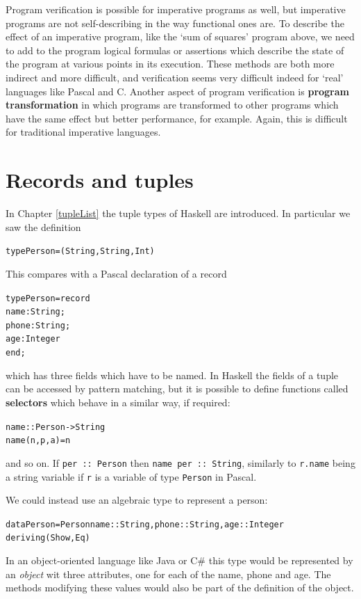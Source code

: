Program verification is possible for imperative programs as well, but
imperative programs are not self-describing in the way functional ones are.
To describe the effect of an imperative program, like the `sum of squares'
program above, we need to add to the program logical formulas or assertions
which describe the state of the program at various points in its execution.
These methods are both more indirect and more difficult, and verification
seems very difficult indeed for `real' languages like Pascal and 
C. Another aspect of program verification is \textbf{program transformation} in
which programs are transformed to other programs which have the same effect but
better performance, for example. Again, this is difficult for
traditional imperative languages.


\section*{Records and tuples}
\vspace{-6pt}

In Chapter \ref{tupleList} the tuple types of Haskell are introduced. In
particular we saw the definition
\begin{alltt}
type Person = (String,String,Int)
\end{alltt}
This compares with a Pascal declaration of a record
\begin{alltt}
type Person = record 
  name  : String;
  phone : String;
  age   : Integer
end;
\end{alltt} 
which has three fields which have to be named. In Haskell the fields of a
tuple can be accessed by pattern matching, but it is possible to define
functions called \textbf{selectors} which behave in a similar way, if
required:  
\begin{alltt}
name  :: Person -> String
name (n,p,a) = n
\end{alltt}
and so on. If \texttt{per ::\ Person} then \texttt{name per ::\ String}, similarly
to  \texttt{r.name} being a string variable if \texttt{r} is a variable of type 
\texttt{Person} in Pascal.

We could instead use an algebraic type to represent a person:
\begin{alltt}
data Person = Person {name::String, phone::String, age::Integer}
              deriving (Show,Eq)
\end{alltt}
In an object-oriented language like Java or C\# this type would be represented by an \emph{object} wit three attributes, one for each of the name, phone and age.  The methods modifying these values would also be part of the definition of the object.

